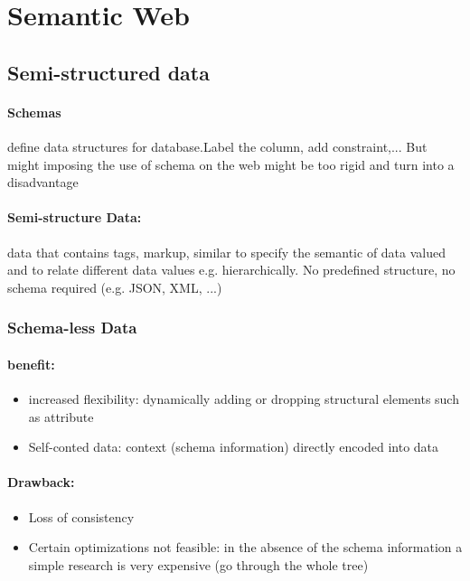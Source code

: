 \section{Semantic Web}


\subsection{Semi-structured data}

\paragraph{Schemas} define data structures for database.Label the column, add constraint,... But might imposing the use of schema on the web might be too rigid and turn into a disadvantage

\paragraph{Semi-structure Data:} data that contains tags, markup, similar to specify the semantic of data valued and to relate different data values e.g. hierarchically. No predefined structure, no schema required (e.g. JSON, XML, ...)

\subsubsection{Schema-less Data}

\paragraph{benefit:}

\begin{itemize}
\item increased flexibility: dynamically adding or dropping structural elements such as attribute
\item Self-conted data: context (schema information) directly encoded into data
\end{itemize}

\paragraph{Drawback:}	

\begin{itemize}
\item Loss of consistency
\item Certain optimizations not feasible: in the absence of the schema information a simple research is very expensive (go through the whole tree)
\end{itemize}

